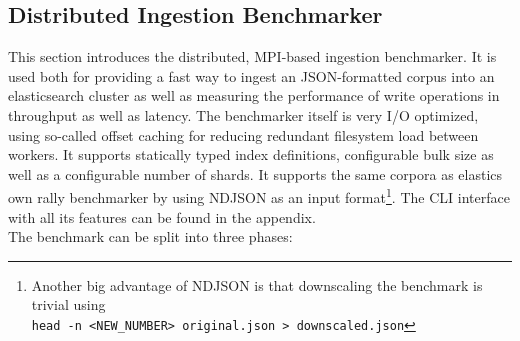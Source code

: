 \newpage

\subsection{Distributed Ingestion Benchmarker}
This section introduces the distributed, \ac{MPI}-based ingestion benchmarker. It is used both for providing a fast way to ingest an \ac{JSON}-formatted corpus into an elasticsearch cluster as well as measuring the performance of write operations in throughput as well as latency. The benchmarker itself is very I/O optimized, using so-called offset caching for reducing redundant filesystem load between workers. It supports statically typed index definitions, configurable bulk size as well as a configurable number of shards. It supports the same corpora as elastics own rally benchmarker by using \ac{NDJSON} as an input format\footnote{Another big advantage of \ac{NDJSON} is that downscaling the benchmark is trivial using\\\texttt{head -n <NEW\_NUMBER> original.json > downscaled.json}}. The \ac{CLI} interface with all its features can be found in the appendix.\\

The benchmark can be split into three phases:

